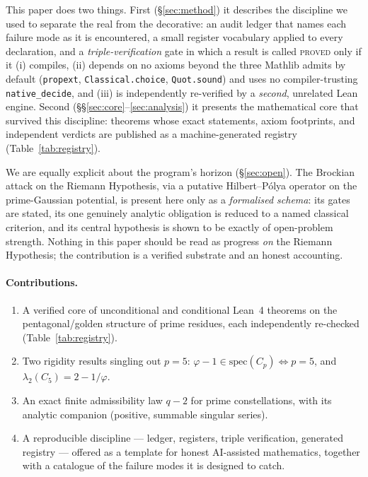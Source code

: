 \documentclass[11pt]{article}
\theoremstyle{definition}
\theoremstyle{remark}
\newcommand{\phigr}{\varphi}
\newcommand{\lean}[1]{\texttt{#1}}
\begin{document}
This paper does two things. First (\S\ref{sec:method}) it describes the discipline we used to
separate the real from the decorative: an audit ledger that names each failure mode as it is
encountered, a small register vocabulary applied to every declaration, and a
\emph{triple-verification} gate in which a result is called \textsc{proved} only if it (i)
compiles, (ii) depends on no axioms beyond the three Mathlib admits by default
(\lean{propext}, \lean{Classical.choice}, \lean{Quot.sound}) and uses no compiler-trusting
\lean{native\_decide}, and (iii) is independently re-verified by a \emph{second}, unrelated
Lean engine. Second (\S\S\ref{sec:core}--\ref{sec:analysis}) it presents the mathematical
core that survived this discipline: \nTheorems{} theorems whose exact statements, axiom
footprints, and independent verdicts are published as a machine-generated registry
(Table~\ref{tab:registry}).

We are equally explicit about the program's horizon (\S\ref{sec:open}). The Brockian attack on
the Riemann Hypothesis, via a putative Hilbert--P\'olya operator on the prime-Gaussian
potential, is present here only as a \emph{formalised schema}: its gates are stated, its one
genuinely analytic obligation is reduced to a named classical criterion, and its central
hypothesis is shown to be exactly of open-problem strength. Nothing in this paper should be
read as progress \emph{on} the Riemann Hypothesis; the contribution is a verified substrate
and an honest accounting.

\paragraph{Contributions.}
\begin{enumerate}[leftmargin=*,itemsep=2pt]
  \item A verified core of \nProved{} unconditional and \nConditional{} conditional Lean~4
  theorems on the pentagonal/golden structure of prime residues, each independently re-checked
  (Table~\ref{tab:registry}).
  \item Two rigidity results singling out $p=5$: $\phigr-1\in\mathrm{spec}(C_p)\iff p=5$, and
  $\lambda_2(C_5)=2-1/\phigr$.
  \item An exact finite admissibility law $q-2$ for prime constellations, with its analytic
  companion (positive, summable singular series).
  \item A reproducible discipline --- ledger, registers, triple verification, generated
  registry --- offered as a template for honest AI-assisted mathematics, together with a
  catalogue of the failure modes it is designed to catch.
\end{enumerate}
\end{document}
